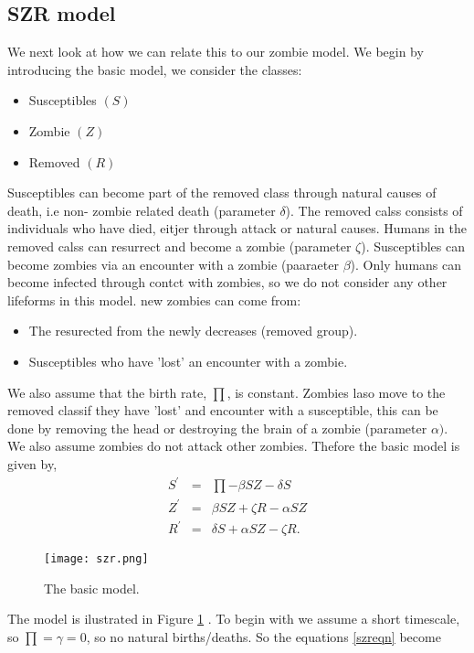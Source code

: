 \documentclass{mm2}
\numberwithin{equation}{section}
\theoremstyle{definition}
\begin{document}
\subsection{SZR model}
We next look at how we can relate this to our zombie model. We begin by introducing the basic model, we consider the classes:
\begin{itemize}
	\item Susceptibles $(S)$
	\item Zombie $(Z)$
	\item Removed $(R)$
\end{itemize}
Susceptibles can become part of the removed class through natural causes of death, i.e non- zombie  related death (parameter $\delta$). The removed calss consists of individuals who have died, eitjer through attack or natural causes. Humans in the removed calss can resurrect and become a zombie (parameter $\zeta$). Susceptibles can become zombies via an encounter with a zombie (paaraeter $\beta$). Only humans can become infected through contct with zombies, so we do not consider any other lifeforms in this model. new zombies can come from:
\begin{itemize}
	\item The resurected from the newly decreases (removed group).
	\item Susceptibles who have 'lost' an encounter with a zombie.
\end{itemize}
We also assume that the birth rate, $\prod$, is constant. Zombies laso move  to the removed classif they have 'lost' and encounter with a susceptible, this can be done by removing the head or destroying the brain of a zombie (parameter $\alpha)$. We also assume zombies do not attack other zombies. Thefore the basic model is given by, 
\begin{eqnarray}
S^{'} &=& \prod - \beta SZ - \delta S \nonumber \\
Z^{'} &=& \beta SZ + \zeta R - \alpha SZ \nonumber \\
R^{'} &=& \delta S + \alpha SZ - \zeta R.
\label{szreqn}
\end{eqnarray}
\begin{figure}[ht]
	\centering
	\texttt{[image: szr.png]}
	\caption{The basic model.}
	\label{szr}
\end{figure}\newline
The model is ilustrated in Figure \ref{szr} \cite{Munz}. 
To begin with we assume a short timescale, so $\prod = \gamma = 0$, so no natural births/deaths. So the equations \ref{szreqn} become
\end{document}
